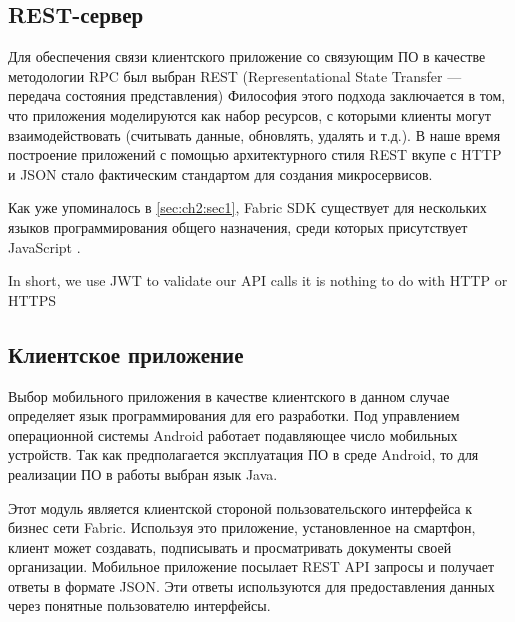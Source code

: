 \subsection{REST-сервер} \label{subsec:ch2/sec3/subsec3}

Для обеспечения связи клиентского приложение со связующим ПО в качестве методологии RPC был выбран REST (Representational State Transfer — передача состояния представления)\cite{restful} Философия этого подхода заключается в том, что приложения моделируются как набор ресурсов, с которыми клиенты могут взаимодействовать (считывать данные, обновлять, удалять и т.д.). В наше время построение приложений с помощью архитектурного стиля REST вкупе с HTTP и JSON \cite{js-json} стало фактическим стандартом для создания микросервисов.

Как уже упоминалось в \ref{sec:ch2:sec1}, Fabric SDK существует для нескольких языков программирования общего назначения, среди которых присутствует JavaScript \cite{pure-js}. 

In short, we use JWT to validate our API calls it is nothing to do with HTTP or HTTPS

\subsection{Клиентское приложение}
 \label{subsec:ch2/sec3/subsec4}
 
Выбор мобильного приложения в качестве клиентского в данном случае определяет язык программирования для его разработки.
Под управлением операционной системы Android работает подавляющее число мобильных устройств. Так как предполагается эксплуатация ПО в среде Android, то для реализации ПО в работы выбран язык Java.
 
Этот модуль является  клиентской стороной пользовательского интерфейса к 
бизнес сети Fabric.  Используя это приложение,  установленное  на 
смартфон,  клиент  может создавать, подписывать и просматривать документы своей организации.  Мобильное 
приложение посылает REST API запросы и получает ответы в формате JSON. Эти 
ответы  используются  для  предоставления  данных  через  понятные  пользователю интерфейсы.
 
